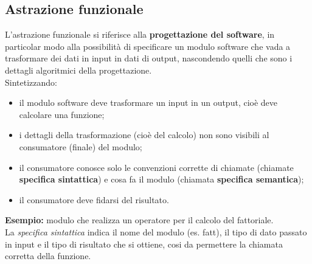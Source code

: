 \documentclass{article}
\begin{document}
	\subsection{Astrazione funzionale}
	L'astrazione funzionale si riferisce alla \textbf{progettazione del software}, in particolar modo alla possibilità di specificare un modulo software che vada a trasformare dei dati in input in dati di output, nascondendo quelli che sono i dettagli algoritmici della progettazione.
	\vspace{\baselineskip}\\
	Sintetizzando:
	\begin{itemize}
		\item il modulo software deve trasformare un input in un output, cioè deve calcolare una funzione;
		\item i dettagli della trasformazione (cioè del calcolo) non sono visibili al consumatore (finale) del modulo;
		\item il consumatore conosce solo le convenzioni corrette di chiamate (chiamate \textbf{specifica sintattica}) e cosa fa il modulo (chiamata \textbf{specifica semantica});
		\item il consumatore deve fidarsi del risultato.
	\end{itemize}
	\textbf{Esempio:} modulo che realizza un operatore per il calcolo del fattoriale.\\
	La \textit{specifica sintattica} indica il nome del modulo (es. fatt), il tipo di dato passato in input e il tipo di risultato che si ottiene, cosi da permettere la chiamata corretta della funzione.\\ 
	
\end{document}
